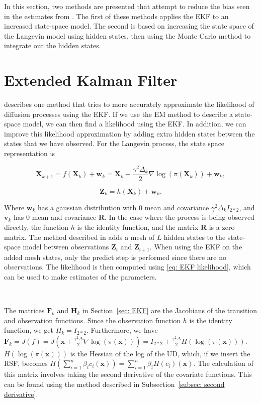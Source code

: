 
\label{chap: methods}
In this section, two methods are presented that attempt to reduce the bias seen in the estimates from \textcite{michelot_langevin_2019}. The first of these methods applies the EKF to an increased state-space model. The second is based on increasing the state space of the Langevin model using hidden states, then using the Monte Carlo method to integrate out the hidden states. 

\section{Extended Kalman Filter}
\textcite{kulikov_extended_2024} describes one method that tries to more accurately approximate the likelihood of diffusion processes using the EKF. If we use the EM method to describe a state-space model, we can then find a likelihood using the EKF. In addition, we can improve this likelihood approximation by adding extra hidden states between the states that we have observed. For the Langevin process, the state space representation is 

$$\textbf{X}_{k+1} = f(\textbf{X}_k) + \textbf{w}_k = \textbf{X}_k + \frac{\gamma^2\Delta_k}{2}\nabla \log(\pi(\textbf{X}_k)) + \textbf{w}_k,$$

$$\textbf{Z}_k = h(\textbf{X}_k) + \textbf{w}_k.$$

Where $\textbf{w}_k$ has a gaussian distribution with $0$ mean and covariance $\gamma^2\Delta_k I_{2*2}$, and $\textbf{v}_k$ has $0$ mean and covariance $\textbf{R}$. In the case where the process is being observed directly, the function $h$ is the identity function, and the matrix $\textbf{R}$ is a zero matrix. The method described in \textcite{kulikov_extended_2024} adds a mesh of $L$ hidden states to the state-space model between observations $\textbf{Z}_i$ and $\textbf{Z}_{i+1}$. When using the EKF on the added mesh states, only the predict step is performed since there are no observations. The likelihood is then computed using \eqref{eq: EKF likelihood}, which can be used to make estimates of the parameters. 

\

The matrices $\textbf{F}_k$ and $\textbf{H}_k$ in Section~\ref{sec: EKF} are the Jacobians of the transition and observation functions. Since the observation function $h$ is the identity function, we get $H_k = I_{2*2}$. Furthermore, we have $\textbf{F}_k = J(f) = J(\textbf{x} + \frac{\gamma^2 \Delta}{2}\nabla \log(\pi(\textbf{x}))) = I_{2*2} + \frac{\gamma^2 \Delta}{2} H(\log(\pi(\textbf{x})))$. $H(\log(\pi(\textbf{x})))$ is the Hessian of the log of the UD, which, if we insert the RSF, becomes $H(\sum_{i=1}^n \beta_i c_i(\textbf{x})) = \sum_{i=1}^n \beta_iH( c_i)(\textbf{x})$. The calculation of this matrix involves taking the second derivative of the covariate functions. This can be found using the method described in Subsection~\ref{subsec: second derivative}.




